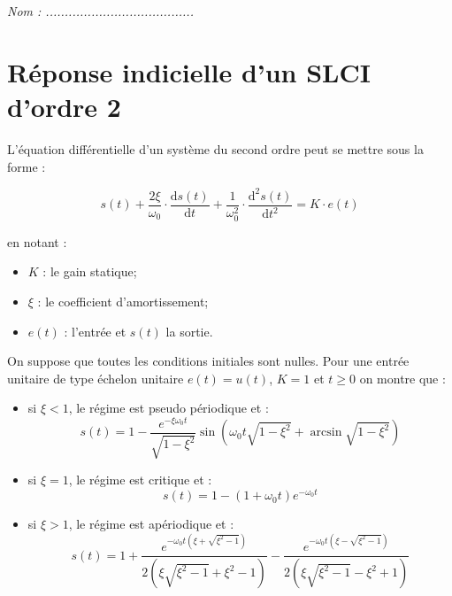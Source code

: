 \documentclass[10pt]{article}
\newif\ifprof
\begin{document}


\ifprof
\begin{center}
\large{\textit{Éléments de corrigé}}
\end{center}
\else
\begin{center}
\large{\textsl{Nom : .......................................}}
\end{center}
\fi

\section{Réponse indicielle d'un SLCI d'ordre 2}

L'équation différentielle d'un système du second ordre peut se mettre sous la forme :

\vspace{.25cm}

\begin{minipage}[c]{.48\linewidth}
$$
s(t)
+\dfrac{2\xi}{\omega_0}\cdot \dfrac{\text{d}s(t)}{\text{d}t}
+\dfrac{1}{\omega_0^2}\cdot \dfrac{\text{d}^2s(t)}{\text{d}t^2}
= K\cdot e(t)
$$
\end{minipage}\hfill
\begin{minipage}[c]{.48\linewidth}
en notant :
\begin{itemize}
\item $K$ : le gain statique;
\item $\xi$ : le coefficient d'amortissement;
\item $e(t)$ : l'entrée et $s(t)$ la sortie. 
\end{itemize}
\end{minipage}

\vspace{.5cm}

On suppose que toutes les conditions initiales sont nulles. Pour une entrée unitaire de type échelon unitaire $e(t)=u(t)$, $K=1$ et $t\geq0$ on montre que : 
\begin{itemize}
\item si $\xi <1$, le régime est pseudo périodique et :
$$
s(t)=1-\dfrac{e^{-\xi\omega_0 t}}{\sqrt{1-\xi^2}}\sin\left(  \omega_0 t\sqrt{1-\xi^2}+\arcsin \sqrt{1-\xi^2} \right)
$$
\item si $\xi=1$, le régime est critique et : 
$$
s(t)=1-\left(1+\omega_0 t \right)e^{-\omega_0 t} 
$$
\item si $\xi>1$, le régime est apériodique et : 
$$
s(t)=1
+\dfrac{e^{- \omega_0 t\left( \xi + \sqrt{\xi^2-1}\right)}}{2\left(\xi\sqrt{\xi^2-1}+\xi^2-1 \right)}
-\dfrac{e^{- \omega_0 t \left( \xi - \sqrt{\xi^2-1}\right)}}{2\left(\xi\sqrt{\xi^2-1}-\xi^2+1 \right)}
$$
\end{itemize} 
\end{document}
